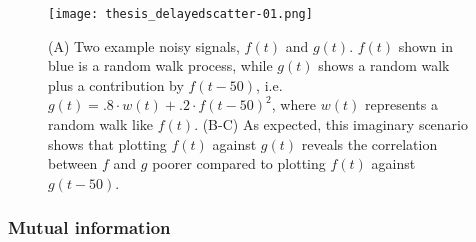 {\begin{figure}
	\centering
	\texttt{[image: thesis\_delayedscatter-01.png]}
	\caption{ 
		(A) Two example noisy signals, $f(t)$ and $g(t)$. $f(t)$ shown in blue is a random walk process, while $g(t)$ shows a random walk plus a contribution by $f(t-50)$, i.e. $g(t)=.8\cdot w(t)+.2\cdot f(t-50)^2$, where $w(t)$ represents a random walk like $f(t)$.
		(B-C) As expected, this imaginary scenario shows that plotting $f(t)$ against $g(t)$ reveals the correlation between $f$ and $g$ poorer compared to plotting $f(t)$ against $g(t-50)$.
	}
	\label{fig:mm:delayedscatter}
\end{figure}


\subsubsection{Mutual information}

%

}
